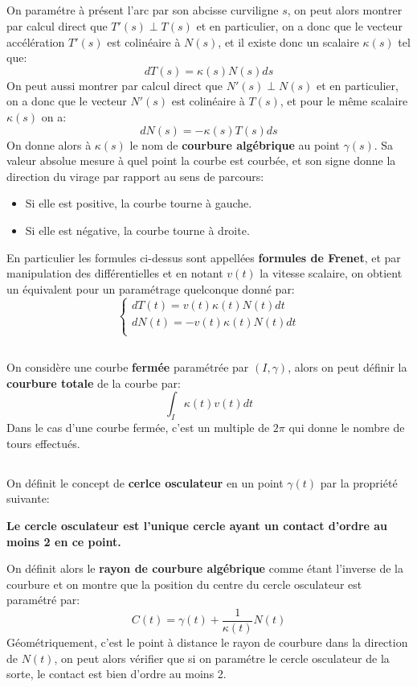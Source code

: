 \subsection*{}
On paramétre à présent l'arc par son abcisse curviligne \(s\), on peut alors montrer par calcul direct que \(T'(s) \perp T(s) \) et en particulier, on a donc que le vecteur accélération \(T'(s)\) est colinéaire à \(N(s)\), et il existe donc un scalaire \(\kappa(s)\) tel que:
\[
   dT(s) = \kappa(s)N(s)ds
\]
On peut aussi montrer par calcul direct que \(N'(s) \perp N(s) \) et en particulier, on a donc que le vecteur \(N'(s)\) est colinéaire à \(T(s)\), et pour le même scalaire \(\kappa(s)\) on a:
\[
   dN(s) = -\kappa(s)T(s)ds
\]
On donne alors à \(\kappa(s)\) le nom de \textbf{courbure algébrique} au point \(\gamma(s)\). Sa valeur absolue mesure à quel point la courbe est courbée, et son signe donne la direction du virage par rapport au sens de parcours:
\begin{itemize}
   \item Si elle est positive, la courbe tourne à gauche.
   \item Si elle est négative, la courbe tourne à droite.
\end{itemize}
En particulier les formules ci-dessus sont appellées \textbf{formules de Frenet}, et par manipulation des différentielles et en notant \(v(t)\) la vitesse scalaire, on obtient un équivalent pour un paramétrage quelconque donné par:
\[
   \begin{cases}
      dT(t) = v(t)\kappa(t)N(t)dt\\
      dN(t) = -v(t)\kappa(t)N(t)dt\\
   \end{cases}   
\]
\subsection*{}
On considère une courbe \textbf{fermée} paramétrée par \((I, \gamma)\), alors on peut définir la \textbf{courbure totale} de la courbe par:
\[
   \int_I\kappa(t)v(t)dt   
\]
Dans le cas d'une courbe fermée, c'est un multiple de \(2\pi\) qui donne le nombre de tours effectués.
\pagebreak
\subsection*{}
On définit le concept de \textbf{cerlce osculateur} en un point \(\gamma(t)\) par la propriété suivante:
\begin{center}
   \textbf{Le cercle osculateur est l'unique cercle ayant un contact d'ordre au moins 2 en ce point.}
\end{center}
On définit alors le \textbf{rayon de courbure algébrique} comme étant l'inverse de la courbure et on montre que la position du centre du cercle osculateur est paramétré par:
\[
   C(t) = \gamma(t) + \frac{1}{\kappa(t)}N(t) 
\] 
Géométriquement, c'est le point à distance le rayon de courbure dans la direction de \(N(t)\), on peut alors vérifier que si on paramétre le cercle osculateur de la sorte, le contact est bien d'ordre au moins 2.\< 


